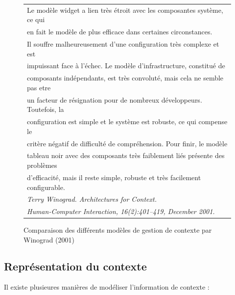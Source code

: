 \begin{figure}[h]
  \centering
  \begin{tabular}{l}
    Le modèle widget a lien très étroit avec les composantes système, ce qui \\
    en fait le modèle de plus efficace dans certaines circonstances. \\
    Il souffre malheureusement d'une configuration très complexe et est \\
    impuissant face à l'échec. Le modèle d'infrastructure, constitué de \\
    composants indépendants, est très convoluté, mais cela ne semble pas etre \\
    un facteur de résignation pour de nombreux développeurs. Toutefois, la \\
    configuration est simple et le système est robuste, ce qui compense le \\
    critère négatif de difficulté de compréhension. Pour finir, le modèle \\
    tableau noir avec des composants très faiblement liés présente des problèmes \\
    d'efficacité, mais il reste simple, robuste et très facilement configurable.
    \cite{winograd_architectures_2001} \\
    \em \footnotesize Terry Winograd. Architectures for Context. \\
    \em \footnotesize Human-Computer Interaction, 16(2):401–419,
     December 2001. \\
  \end{tabular}
  \caption{Comparaison des différents modèles de gestion de contexte par
  Winograd (2001)}
  \label{fig:quote}
\end{figure}

\subsection{Représentation du contexte}

Il existe plusieures manières de modéliser l'information de contexte :

